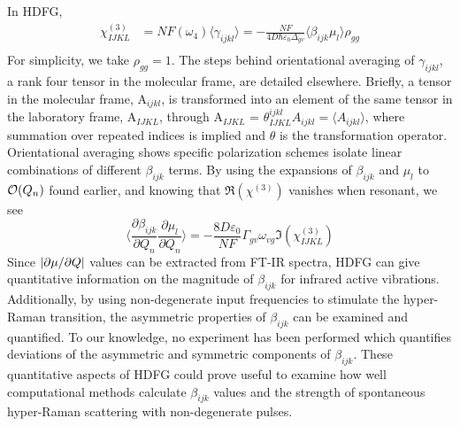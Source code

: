 \documentclass[aip, jcp, reprint, onecolumn]{revtex4-2}
\begin{document}
In HDFG, 
\begin{equation}\label{chi3}
\begin{split}
		\chi^{(3)}_{IJKL} &= NF(\omega_4) \langle \gamma_{ijkl} \rangle = -\frac{NF}{4D \hbar \varepsilon_0 \Delta_{gv}} \langle \beta_{ijk} \mu_l \rangle \rho_{gg}\\
\end{split}
\end{equation}
For simplicity, we take $\rho_{gg} = 1$.
The steps behind orientational averaging of $\gamma_{ijkl}$, a rank four tensor in the molecular frame, are detailed elsewhere.\cite{Andrews1977, McDonnell2024}
Briefly, a tensor in the molecular frame, A$_{ijkl}$, is transformed into an element of the same tensor in the laboratory frame, A$_{IJKL}$, through A$_{IJKL}$ = $\theta^{ijkl}_{IJKL} A_{ijkl} = \langle A_{ijkl} \rangle$, where summation over repeated indices is implied and $\theta$ is the transformation operator. \cite{McDonnell2024}
Orientational averaging shows specific polarization schemes isolate linear combinations of different $\beta_{ijk}$ terms. \cite{Bersohn1966, Willetts1992, Kauranen1996}
By using the expansions of $\beta_{ijk}$ and $\mu_{l}$ to $\order{Q_n}$ found earlier, and knowing that $\Re(\chi^{(3)})$ vanishes when resonant, we see
\begin{equation}\label{betasive}
	\langle \frac{\partial \beta_{ijk}}{\partial Q_n} {\frac{\partial \mu_l}{\partial Q_n}} \rangle = -\frac{8D \varepsilon_0}{NF}  {\Gamma_{gv} \omega_{vg}} {\Im(\chi^{(3)}_{IJKL})}
\end{equation}
Since $\abs{\partial \mu / \partial Q}$ values can be extracted from FT-IR spectra, HDFG can give quantitative information on the magnitude of $\beta_{ijk}$ for infrared active vibrations.
Additionally, by using non-degenerate input frequencies to stimulate the hyper-Raman transition, the asymmetric properties of $\beta_{ijk}$ can be examined and quantified. \cite{Christie1971, Denisov1986, Kozich2007}
To our knowledge, no experiment has been performed which quantifies deviations of the asymmetric and symmetric components of $\beta_{ijk}$. 
These quantitative aspects of HDFG could prove useful to examine how well computational methods calculate $\beta_{ijk}$ values and the strength of spontaneous hyper-Raman scattering with non-degenerate pulses.
\end{document}
